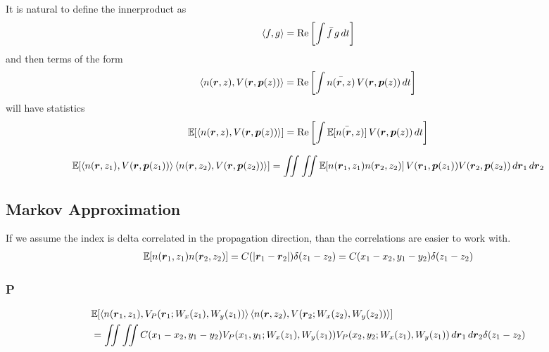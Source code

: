 It is natural to define the innerproduct as
\begin{equation}
\begin{split}
\left \langle f,g \right \rangle = \mathcal{\rm{Re}}\left[\int \bar{f}\, g \,dt\right] 
\end{split}
\end{equation}
and then terms of the form 
\begin{equation}
\begin{split}
\left \langle n(\mbox{\boldmath{$r$}},z),V(\mbox{\boldmath{$r$}},\mbox{\boldmath{$p$}}(z)) \right \rangle = \mathcal{\rm{Re}}\left[\int \bar{n(\mbox{\boldmath{$r$}},z)}\, V(\mbox{\boldmath{$r$}},\mbox{\boldmath{$p$}}(z)) \,dt\right]
\end{split}
\end{equation}
will have statistics 
\begin{equation}
\begin{split}
\Expect{\ip{n(\vect{r},z)}{V(\vect{r},\vect{p}(z))}} = \Ip{\Expect{n(\vect{r},z)}}{V(\vect{r},\vect{p}(z))}
\end{split}
\end{equation}

\begin{equation}
\begin{split}
\Expect{\ip{n(\vect{r},z_1)}{V(\vect{r},\vect{p}(z_1))}\ip{n(\vect{r},z_2)}{V(\vect{r},\vect{p}(z_2))}} 
= \iint \iint   \Expect{n(\vect{r}_1,z_1)n(\vect{r}_2,z_2)} V(\vect{r}_1,\vect{p}(z_1))V(\vect{r}_2,\vect{p}(z_2)) \,d\vect{r}_1\,d\vect{r}_2
\end{split}
\end{equation}



\subsection{Markov Approximation}
If we assume the index is delta correlated in the propagation direction, than the correlations are easier to work with.
\begin{equation}
\begin{split}
 \Expect{n(\vect{r}_1,z_1)n(\vect{r}_2,z_2)} = C(|\vect{r}_1-\vect{r}_2|)\delta(z_1-z_2) = C(x_1-x_2,y_1-y_2)\delta(z_1-z_2)
\end{split}
\end{equation}

\subsubsection{P}
\begin{equation}
\begin{split}
&\Expect{\ip{n(\vect{r}_1,z_1)}{V_{P}(\vect{r}_1;W_x(z_1),W_y(z_1))}\ip{n(\vect{r},z_2)}{V(\vect{r}_2;W_x(z_2),W_y(z_2))}} \\
&= \iint \iint   C(x_1-x_2,y_1-y_2) V_{P}(x_1,y_1;W_x(z_1),W_y(z_1)) V_{P}(x_2,y_2;W_x(z_1),W_y(z_1)) \,d\vect{r}_1\,d\vect{r}_2 \delta(z_1-z_2)
\end{split}
\end{equation}



